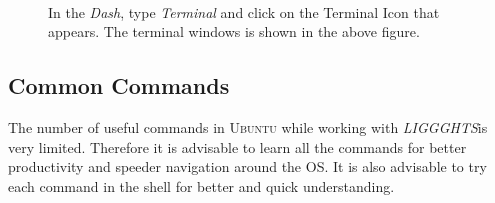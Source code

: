 \documentclass{tufte-book} %
\newcommand{\Li}{\textit{LIGGGHTS}}
\begin{document}
\begin{figure}[p]
\\\vspace{\baselineskip}
\caption{In the \emph{Dash}, type \emph{Terminal} and click on the Terminal Icon that appears. The terminal windows is shown in the above figure.}
\end{figure}





\subsection{Common Commands}

\begin{fullwidth}
  The number of useful commands in \textsc{Ubuntu} while working with \Li is very limited. Therefore it is advisable to learn all the commands for better productivity and speeder navigation around the OS. It is also advisable to try each command in the shell for better and quick understanding. 
\end{fullwidth}
\end{document}
